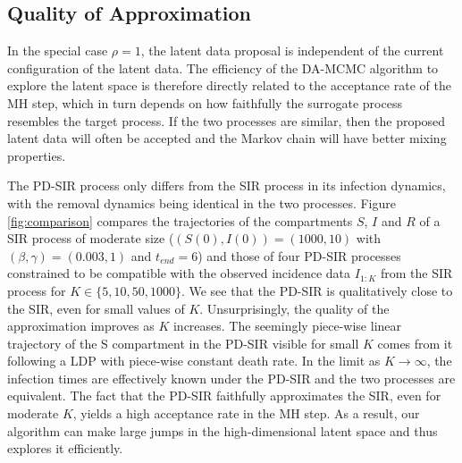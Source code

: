 \documentclass[11pt]{article}
\begin{document}
	\subsection{Quality of Approximation}
	\label{sec:qua}
	
	In the special case $\rho=1$, the latent data proposal is independent of the current configuration of the latent data. The efficiency of the DA-MCMC algorithm to explore the latent space is therefore directly related to the acceptance rate of the MH step, which in turn depends on how faithfully the surrogate process resembles the target process. If the two processes are similar, then the proposed latent data will often be accepted and the Markov chain will have better mixing properties.
	
	The PD-SIR process only differs from the SIR process in its infection dynamics, with the removal dynamics being identical in the two processes. Figure \ref{fig:comparison} compares the trajectories of the compartments $S$, $I$ and $R$ of a SIR process of moderate size ($(S(0), I(0)) = (1000, 10)$ with $(\beta, \gamma) = (0.003, 1)$ and $t_{end} = 6$) and those of four PD-SIR processes constrained to be compatible with the observed incidence data $I_{1:K}$ from the SIR process for $K \in \{5, 10, 50, 1000\}$. We see that the PD-SIR is qualitatively close to the SIR, even for small values of $K$. Unsurprisingly, the quality of the approximation improves as $K$ increases. The seemingly piece-wise linear trajectory of the S compartment in the PD-SIR visible for small $K$ comes from it following a LDP with piece-wise constant death rate. In the limit as $K \rightarrow \infty$, the infection times are effectively known under the PD-SIR and the two processes are equivalent.
	The fact that the PD-SIR faithfully approximates  the SIR, even for moderate $K$, yields a high acceptance rate in the MH step. As a result, our algorithm can make large jumps in the high-dimensional latent space and thus explores it efficiently. 
	
\end{document}
